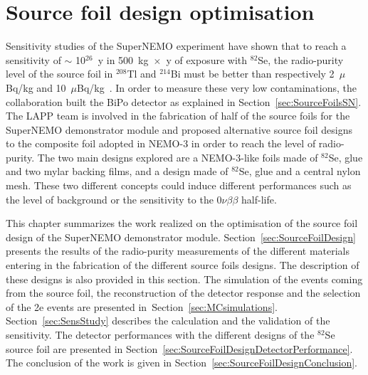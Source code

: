 \documentclass[main.tex]{subfiles}
\begin{document}
\chapter{Source foil design optimisation}




\NI Sensitivity studies of the SuperNEMO experiment have shown that to reach a sensitivity of $\sim$ 10$^{\text{26}}$~y in 500~kg~$\times$~y of exposure with $^{\text{82}}$Se, the radio-purity level of the source foil in $^{\text{208}}$Tl and $^{\text{214}}$Bi must be better than respectively 2~$\mu$Bq/kg and 10~$\mu$Bq/kg~\cite{PhysicsCaseSuperNEMO}. In order to measure these very low contaminations, the collaboration built the BiPo detector as explained in Section~\ref{sec:SourceFoilsSN}. The LAPP team is involved in the fabrication of half of the source foils for the SuperNEMO demonstrator module and proposed alternative source foil designs to the composite foil adopted in NEMO-3 in order to reach the level of radio-purity. The two main designs explored are a NEMO-3-like foils made of $^{\text{82}}$Se, glue and two mylar backing films, and a design made of $^{\text{82}}$Se, glue and a central nylon mesh. These two different concepts could induce different performances such as the level of background or the sensitivity to the 0$\nu\beta\beta$ half-life. 



\bigskip


\NI This chapter summarizes the work realized on the optimisation of the source foil design of the SuperNEMO demonstrator module. Section~\ref{sec:SourceFoilDesign} presents the results of the radio-purity measurements of the different materials entering in the fabrication of the different source foils designs. The description of these designs is also provided in this section. The simulation of the events coming from the source foil, the reconstruction of the detector response and the selection of the 2e events are presented in~Section~\ref{sec:MCsimulations}. Section~\ref{sec:SensStudy} describes the calculation and the validation of the sensitivity. The detector performances with the different designs of the $^{\text{82}}$Se source foil are presented in Section~\ref{sec:SourceFoilDesignDetectorPerformance}. The conclusion of the work is given in Section~\ref{sec:SourceFoilDesignConclusion}.
\end{document}
